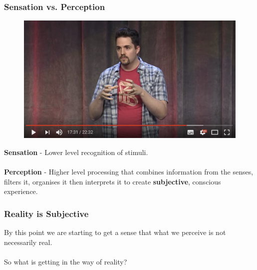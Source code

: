 \begin{frame}
	\frametitle{Sensation vs. Perception}	
	\begin{figure}
		\href{https://youtu.be/Ebwtq1HZJ2A?t=1051}{ \includegraphics[scale=.17]{assets/sensation}  }
	\end{figure}
	\textbf{Sensation} - Lower level recognition of stimuli. \\~\\
	\textbf{Perception} - Higher level processing that combines information from the senses, filters it, organises it then interprets it to create \textbf{subjective}, conscious experience. 
\end{frame}


\begin{frame}
	\frametitle{Reality is Subjective}
	By this point we are starting to get a sense that what we perceive is not necessarily real. \\~\\ \pause
	So what is getting in the way of reality? 
\end{frame}

